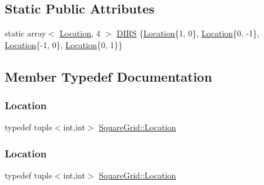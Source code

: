 \subsection*{Static Public Attributes}
\begin{DoxyCompactItemize}
\item 
static array$<$ \mbox{\hyperlink{structSquareGrid_a2c9a2cbd3912aa48ac97289abc3f1c0f}{Location}}, 4 $>$ \mbox{\hyperlink{structSquareGrid_aac91cba6573640c545485ed054089c87}{D\+I\+RS}} \{\mbox{\hyperlink{structSquareGrid_a2c9a2cbd3912aa48ac97289abc3f1c0f}{Location}}\{1, 0\}, \mbox{\hyperlink{structSquareGrid_a2c9a2cbd3912aa48ac97289abc3f1c0f}{Location}}\{0, -\/1\}, \mbox{\hyperlink{structSquareGrid_a2c9a2cbd3912aa48ac97289abc3f1c0f}{Location}}\{-\/1, 0\}, \mbox{\hyperlink{structSquareGrid_a2c9a2cbd3912aa48ac97289abc3f1c0f}{Location}}\{0, 1\}\}
\end{DoxyCompactItemize}


\subsection{Member Typedef Documentation}
\mbox{\label{structSquareGrid_a2c9a2cbd3912aa48ac97289abc3f1c0f}} 
\subsubsection{\texorpdfstring{Location}{Location}\hspace{0.1cm}{\footnotesize\ttfamily [1/2]}}
{\footnotesize\ttfamily typedef tuple$<$int,int$>$ \mbox{\hyperlink{structSquareGrid_a2c9a2cbd3912aa48ac97289abc3f1c0f}{Square\+Grid\+::\+Location}}}

\mbox{\label{structSquareGrid_a2c9a2cbd3912aa48ac97289abc3f1c0f}} 
\subsubsection{\texorpdfstring{Location}{Location}\hspace{0.1cm}{\footnotesize\ttfamily [2/2]}}
{\footnotesize\ttfamily typedef tuple$<$int,int$>$ \mbox{\hyperlink{structSquareGrid_a2c9a2cbd3912aa48ac97289abc3f1c0f}{Square\+Grid\+::\+Location}}}



